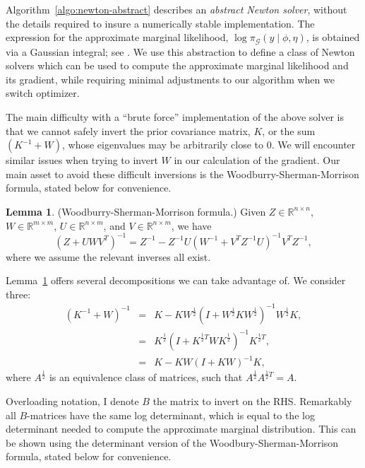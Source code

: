 \documentclass[stslayout, noinfoline]{imsart}
\theoremstyle{definition}
\newtheorem{definition}{Definition}
\newtheorem{lemma}{Lemma}
\begin{document}
Algorithm~\ref{algo:newton-abstract} describes an \textit{abstract Newton solver},
without the details required to insure a numerically stable implementation.
The expression for the approximate marginal likelihood, $\log \pi_\mathcal{G} (y \mid \phi, \eta)$,
is obtained via a Gaussian integral; see \citet[Section 3.4.4]{Rasmussen:2006}.
We use this abstraction to define a class of Newton solvers which can be used to compute the approximate marginal likelihood and its gradient,
while requiring minimal adjustments to our algorithm when we switch optimizer.

The main difficulty with a ``brute force'' implementation of the above solver is that we cannot safely invert the prior covariance matrix, $K$, or the sum $(K^{-1} + W)$, whose eigenvalues may be arbitrarily close to 0.
We will encounter similar issues when trying to invert $W$ in our calculation of the gradient.
Our main asset to avoid these difficult inversions is the Woodburry-Sherman-Morrison formula,
stated below for convenience.
\begin{lemma} \label{lemma:WSM}
(Woodburry-Sherman-Morrison formula.)
Given $Z \in \mathbb R^{n \times n}$, $W \in \mathbb R^{m \times m}$, $U \in \mathbb R^{n \times m}$, and $V \in \mathbb R^{n \times m}$,
we have
\begin{equation*}
  (Z + UWV^T)^{-1} = Z^{-1} - Z^{-1}U(W^{-1} + V^TZ^{-1}U)^{-1} V^T Z^{-1},
\end{equation*} 
where we assume the relevant inverses all exist.
\end{lemma}
%
%
Lemma~\ref{lemma:WSM} offers several decompositions we can take advantage of.
We consider three:
\begin{eqnarray} \label{eq:B-matrix}
(K^{-1} + W)^{-1} & = & K - K W^\frac{1}{2} (I + W^\frac{1}{2} K W^\frac{1}{2})^{-1} W^\frac{1}{2} K, \nonumber \\
  & = & K^\frac{1}{2} (I + K^{\frac{1}{2} T} W K^\frac{1}{2} )^{-1} K^{\frac{1}{2}T}, \nonumber \\
  & = & K - K W (I + KW)^{-1} K,
\end{eqnarray}
%
where $A^\frac{1}{2}$ is an equivalence class of matrices, such that $A^\frac{1}{2} A^{\frac{1}{2} T} = A$.

Overloading notation, I denote $B$ the matrix to invert on the RHS.
Remarkably all $B$-matrices have the same log determinant, 
which is equal to the log determinant needed to compute the approximate marginal distribution.
This can be shown using the determinant version of the Woodbury-Sherman-Morrison formula,
stated below for convenience.
\end{document}

